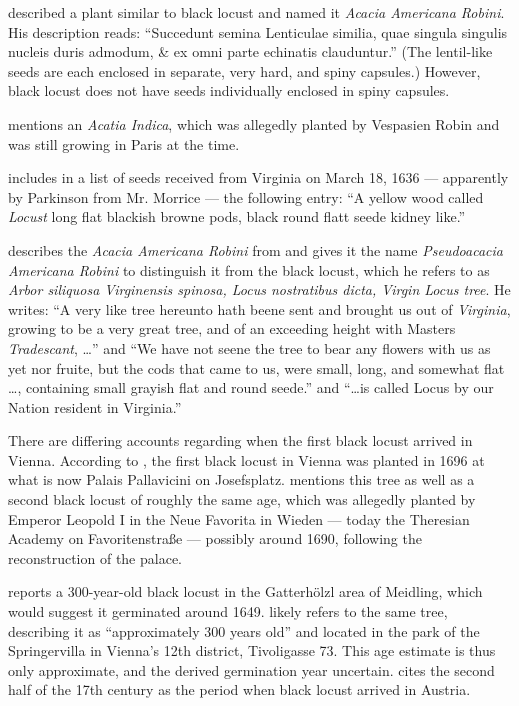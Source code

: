 \citet[pp.~171--173]{cornuti1635robinie} described a plant similar to black locust and named it \emph{Acacia Americana Robini}. His description reads: \enquote{Succedunt semina Lenticulae similia, quae singula singulis nucleis duris admodum, \& ex omni parte echinatis clauduntur.} (The lentil-like seeds are each enclosed in separate, very hard, and spiny capsules.) However, black locust does not have seeds individually enclosed in spiny capsules.

\citet[p.~28]{deLaBrosse1636robinie} mentions an \emph{Acatia Indica}, which was allegedly planted by Vespasien Robin and was still growing in Paris at the time.

\citet[p.~370]{gunther1922botanists} includes in a list of seeds received from Virginia on March 18, 1636 — apparently by Parkinson from Mr. Morrice — the following entry: \enquote{A yellow wood called \emph{Locust} long flat blackish browne pods, black round flatt seede kidney like.}

\citet[p.~1550]{parkinson1640theatrumBotanicum} describes the \emph{Acacia Americana Robini} from \citet{cornuti1635robinie} and gives it the name \emph{Pseudoacacia Americana Robini} to distinguish it from the black locust, which he refers to as \emph{Arbor siliquosa Virginensis spinosa, Locus nostratibus dicta, Virgin Locus tree}. He writes: \enquote{A very like tree hereunto hath beene sent and brought us out of \emph{Virginia}, growing to be a very great tree, and of an exceeding height with Masters \emph{Tradescant}, \dots} and \enquote{We have not seene the tree to bear any flowers with us as yet nor fruite, but the cods that came to us, were small, long, and somewhat flat \dots, containing small grayish flat and round seede.} and \enquote{\dots is called Locus by our Nation resident in Virginia.}

There are differing accounts regarding when the first black locust arrived in Vienna. According to \citet[p.~147]{loudon1838arboretum1}, the first black locust in Vienna was planted in 1696 at what is now Palais Pallavicini on Josefsplatz. \citet[pp.~15--16]{jacquin1825univGarten} mentions this tree as well as a second black locust of roughly the same age, which was allegedly planted by Emperor Leopold I in the Neue Favorita in Wieden — today the Theresian Academy on Favoritenstraße — possibly around 1690, following the reconstruction of the palace.

\citet{jagr1949robinie} reports a 300-year-old black locust in the Gatterhölzl area of Meidling, which would suggest it germinated around 1649. \citet{anonymNatLand1949robinie} likely refers to the same tree, describing it as \enquote{approximately 300 years old} and located in the park of the Springervilla in Vienna’s 12th district, Tivoligasse 73. This age estimate is thus only approximate, and the derived germination year uncertain. \citet[p.~1395]{hegi1924band43} cites the second half of the 17th century as the period when black locust arrived in Austria.

